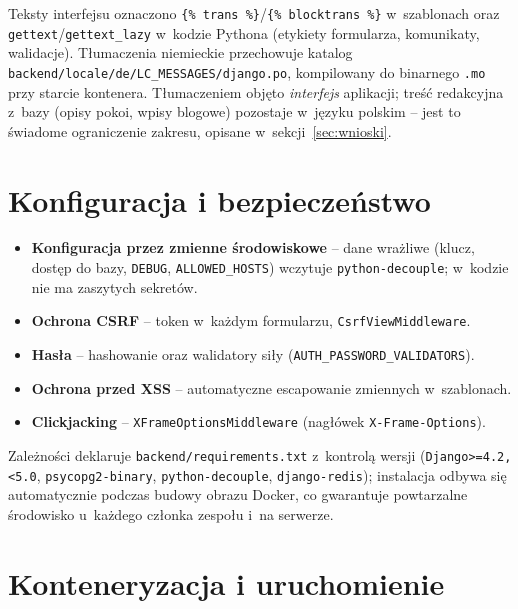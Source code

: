 \documentclass[12pt,a4paper]{article}
\begin{document}
Teksty interfejsu oznaczono \texttt{\{\% trans \%\}}/\texttt{\{\% blocktrans \%\}}
w~szablonach oraz \texttt{gettext}/\texttt{gettext\_lazy} w~kodzie Pythona (etykiety
formularza, komunikaty, walidacje). Tłumaczenia niemieckie przechowuje katalog
\texttt{backend/locale/de/LC\_MESSAGES/django.po}, kompilowany do binarnego
\texttt{.mo} przy starcie kontenera. Tłumaczeniem objęto \emph{interfejs} aplikacji;
treść redakcyjna z~bazy (opisy pokoi, wpisy blogowe) pozostaje w~języku polskim --
jest to świadome ograniczenie zakresu, opisane w~sekcji~\ref{sec:wnioski}.

\section{Konfiguracja i bezpieczeństwo}
\label{sec:bezpieczenstwo}

\begin{itemize}[nosep]
  \item \textbf{Konfiguracja przez zmienne środowiskowe} -- dane wrażliwe (klucz,
    dostęp do bazy, \texttt{DEBUG}, \texttt{ALLOWED\_HOSTS}) wczytuje
    \texttt{python-decouple}; w~kodzie nie ma zaszytych sekretów.
  \item \textbf{Ochrona CSRF} -- token w~każdym formularzu, \texttt{CsrfViewMiddleware}.
  \item \textbf{Hasła} -- hashowanie oraz walidatory siły
    (\texttt{AUTH\_PASSWORD\_VALIDATORS}).
  \item \textbf{Ochrona przed XSS} -- automatyczne escapowanie zmiennych w~szablonach.
  \item \textbf{Clickjacking} -- \texttt{XFrameOptionsMiddleware} (nagłówek
    \texttt{X-Frame-Options}).
\end{itemize}

Zależności deklaruje \texttt{backend/requirements.txt} z~kontrolą wersji
(\texttt{Django>=4.2,<5.0}, \texttt{psycopg2-binary}, \texttt{python-decouple},
\texttt{django-redis}); instalacja odbywa się automatycznie podczas budowy obrazu
Docker, co gwarantuje powtarzalne środowisko u~każdego członka zespołu i~na serwerze.

\section{Konteneryzacja i uruchomienie}
\label{sec:uruchomienie}
\end{document}
